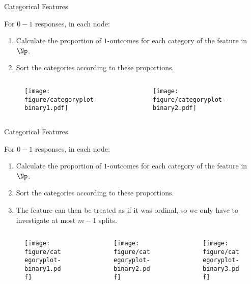\documentclass[11pt,compress,t,notes=noshow, xcolor=table]{beamer}
\begin{document}
  \begin{frame}[noframenumbering]{Categorical Features}

For $0-1$ responses, in each node:
  \begin{enumerate}
  \item Calculate the proportion of $1$-outcomes for each category of the feature in $\Np$.
  \item Sort the categories according to these proportions.
  \end{enumerate}
  \begin{columns}
  \begin{column}{0.33\textwidth}
  \begin{figure}
  \texttt{[image: figure/categoryplot-binary1.pdf]} 
  \end{figure}
  \end{column}
  \begin{column}{0.33\textwidth}
  \begin{figure}
  \texttt{[image: figure/categoryplot-binary2.pdf]} 
  \end{figure}
  \end{column}
  \begin{column}{0.33\textwidth}
  \end{column}
  \end{columns}

\end{frame}

  \begin{frame}[noframenumbering]{Categorical Features}

For $0-1$ responses, in each node:
  \begin{enumerate}
  \item Calculate the proportion of $1$-outcomes for each category of the feature in $\Np$.
  \item Sort the categories according to these proportions.
  \item The feature can then be treated as if it was ordinal, so we only have to investigate at most $m-1$ splits.
  \end{enumerate}
  \begin{columns}
  \begin{column}{0.33\textwidth}
  \begin{figure}
  \texttt{[image: figure/categoryplot-binary1.pdf]} 
  \end{figure}
  \end{column}
  \begin{column}{0.33\textwidth}
  \begin{figure}
  \texttt{[image: figure/categoryplot-binary2.pdf]} 
  \end{figure}
  \end{column}
  \begin{column}{0.33\textwidth}
  \begin{figure}
  \texttt{[image: figure/categoryplot-binary3.pdf]} 
  \end{figure}
  \end{column}
  \end{columns}

\end{frame}
\end{document}
